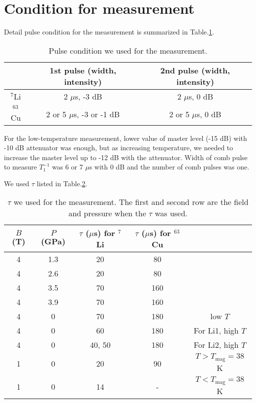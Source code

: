 \documentclass[a4,10.5pt]{report}
\begin{document}
\section{Condition for measurement}
Detail pulse condition for the measurement is summarized in Table.\ref{pulse}.
\begin{table}
\begin{center}
\caption{Pulse condition we used for the measurement.}
\begin{tabular}{ccc} \hline
            & 1st pulse (width, intensity)& 2nd pulse (width, intensity)\\ \hline
 ${}^7$Li   & 2 $\mu$s, -3 dB         & 2 $\mu$s, 0 dB\\ \hline
 ${}^{63}$Cu& 2 or 5 $\mu$s, -3 or -1 dB      & 2 or 5 $\mu$s, 0 dB\\ \hline
\end{tabular}
\label{pulse}
\end{center}
\end{table}
For the low-temperature measurement, lower value of master level (-15 dB) with -10 dB attenuator was enough, but as increasing temperature, we needed to increase the master level
up to -12 dB with the attenuator.
Width of comb pulse to measure $T^{-1}_1$ was 6 or 7 $\mu$s with 0 dB and the number of comb pulses was one.

We used $\tau$ listed in Table.\ref{tau}.
\begin{table}
\begin{center}
\caption{$\tau$ we used for the measurement. The first and second row are the field and pressure when the $\tau$ was used.}
\begin{tabular}{ccccc} \hline
 $B$ (T)& $P$ (GPa)& $\tau$ ($\mu$s) for ${}^7$Li& $\tau$ ($\mu$s) for ${}^{63}$Cu\\ \hline
 4& 1.3& 20& 80&\\ \hline
 4& 2.6& 20& 80&\\ \hline
 4& 3.5& 70& 160&\\ \hline
 4& 3.9& 70& 160&\\ \hline
 4& 0& 70& 180&low $T$\\ \hline
 4& 0& 60& 180&For Li1, high $T$\\ \hline
 4& 0& 40, 50& 180&For Li2, high $T$\\ \hline
 1& 0& 20& 90&$T > T_{\mathrm{mag}} = 38$ K\\ \hline
 1& 0& 14& -&$T < T_{\mathrm{mag}} = 38$ K\\ \hline
\end{tabular}
\label{tau}
\end{center}
\end{table}
\end{document}
